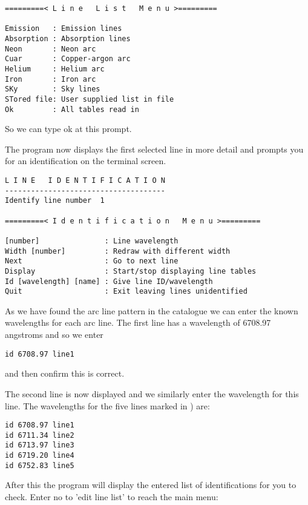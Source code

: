 {\scspec{\small}{ }
\begin{verbatim}
=========< L i n e   L i s t   M e n u >=========

Emission   : Emission lines
Absorption : Absorption lines
Neon       : Neon arc
Cuar       : Copper-argon arc
Helium     : Helium arc
Iron       : Iron arc
SKy        : Sky lines
STored file: User supplied list in file
Ok         : All tables read in
\end{verbatim}
}

So we can type ok at this prompt.

The program now displays the first selected line in more detail and prompts you for an identification on the terminal screen.

{\scspec{\small}{ }
\begin{verbatim}
L I N E   I D E N T I F I C A T I O N
-------------------------------------
Identify line number  1

=========< I d e n t i f i c a t i o n   M e n u >=========

[number]               : Line wavelength
Width [number]         : Redraw with different width
Next                   : Go to next line
Display                : Start/stop displaying line tables
Id [wavelength] [name] : Give line ID/wavelength
Quit                   : Exit leaving lines unidentified

\end{verbatim}
}

As we have found the arc line pattern in the catalogue we can enter the known wavelengths for each arc line. The first line has a wavelength of 6708.97 angstroms and so we enter

{\scspec{\small}{ }
\begin{verbatim}
id 6708.97 line1
\end{verbatim}
}
and then confirm this is correct.

The second line is now displayed and we similarly enter the wavelength for this line. The wavelengths for the five lines marked in )
 are:

{\scspec{\small}{ }
\begin{verbatim}
id 6708.97 line1
id 6711.34 line2
id 6713.97 line3
id 6719.20 line4
id 6752.83 line5
\end{verbatim}
}

After this the program will display the entered list of identifications for you to check. Enter no to 'edit line list' to reach the main menu:

